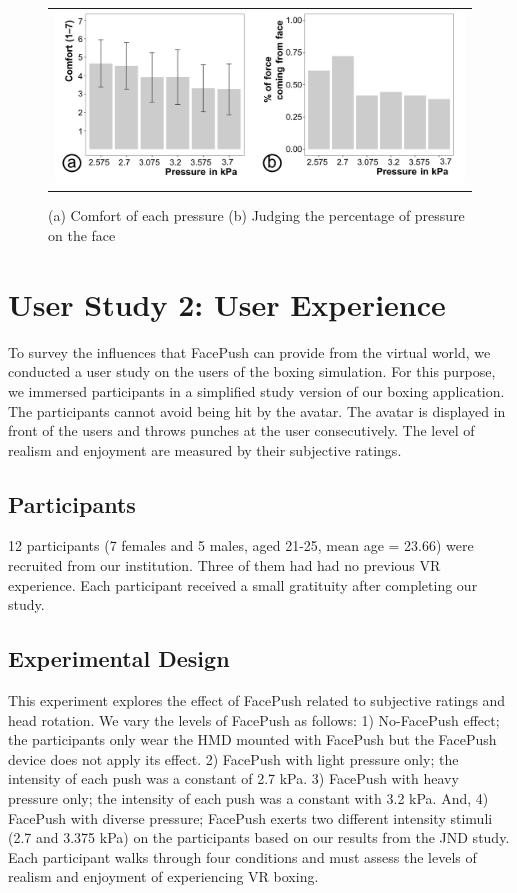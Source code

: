 \begin{figure}[h]
    \begin{center}
        \begin{tabular}{@{\hspace{0.1cm}}c}
           \includegraphics[width=1\linewidth]{figures/comfort}
        \end{tabular}
        \caption{(a) Comfort of each pressure (b) Judging the percentage of pressure on the face}
\label{fig:comfort}
    \end{center}
\end{figure}

\section{User Study 2: User Experience }
To survey the influences that FacePush can provide from the virtual world, we conducted a user study on the users of the boxing simulation. For this purpose, we immersed participants in a simplified study version of our boxing application. The participants cannot avoid being hit by the avatar. The avatar is displayed in front of the users and throws punches at the user consecutively. The level of realism and enjoyment are measured by their subjective ratings.

\subsection{Participants }
12 participants (7 females and 5 males, aged 21-25, mean age = 23.66) were recruited from our institution. Three of them had had no previous VR experience. Each participant received a small gratituity after completing our study.

\subsection{Experimental Design }
This experiment explores the effect of FacePush related to subjective ratings and head rotation. We vary the levels of FacePush as follows: 1) No-FacePush effect; the participants only wear the HMD mounted with FacePush but the FacePush device does not apply its effect. 2) FacePush with light pressure only; the intensity of each push was a constant of 2.7 kPa. 3) FacePush with heavy pressure only; the intensity of each push was a constant with 3.2 kPa. And, 4) FacePush with diverse pressure; FacePush exerts two different intensity stimuli (2.7 and 3.375 kPa) on the participants based on our results from the JND study. Each participant walks through four conditions and must assess the levels of realism and enjoyment of experiencing VR boxing.

